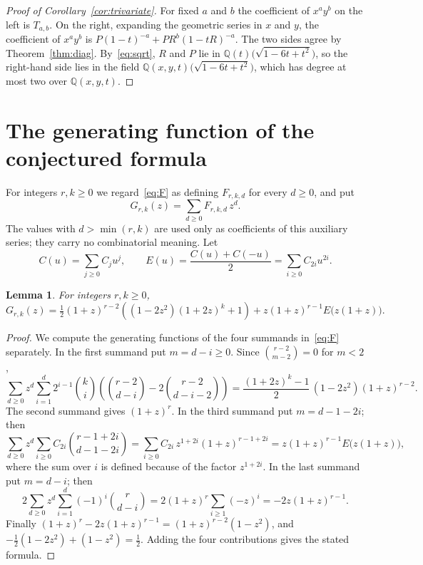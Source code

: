 \documentclass{amsart}
\newtheorem{lemma}[theorem]{Lemma}
\theoremstyle{definition}
\theoremstyle{remark}
\numberwithin{equation}{section}
\newcommand{\Q}{\mathbb{Q}}
\begin{document}
\begin{proof}[Proof of Corollary~\ref{cor:trivariate}]
For fixed $a$ and $b$ the coefficient of $x^ay^b$ on the left is $T_{a,b}$. On the right, expanding the geometric series in $x$ and $y$, the coefficient of $x^ay^b$ is $P(1-t)^{-a}+PR^b(1-tR)^{-a}$. The two sides agree by Theorem~\ref{thm:diag}. By~\eqref{eq:sqrt}, $R$ and $P$ lie in $\Q(t)\bigl(\sqrt{1-6t+t^2}\bigr)$, so the right-hand side lies in the field $\Q(x,y,t)\bigl(\sqrt{1-6t+t^2}\bigr)$, which has degree at most two over $\Q(x,y,t)$.
\end{proof}

\section{The generating function of the conjectured formula}\label{sec:F}

For integers $r,k\ge0$ we regard~\eqref{eq:F} as defining $F_{r,k,d}$ for every $d\ge0$, and put
\[
G_{r,k}(z)=\sum_{d\ge0}F_{r,k,d}\,z^d.
\]
The values with $d>\min(r,k)$ are used only as coefficients of this auxiliary series; they carry no combinatorial meaning. Let
\[
C(u)=\sum_{j\ge0}C_ju^j,\qquad E(u)=\frac{C(u)+C(-u)}{2}=\sum_{i\ge0}C_{2i}u^{2i}.
\]

\begin{lemma}\label{lem:Gz}
For integers $r,k\ge0$,
\[
G_{r,k}(z)=\tfrac12(1+z)^{r-2}\left((1-2z^2)(1+2z)^k+1\right)+z(1+z)^{r-1}E\bigl(z(1+z)\bigr).
\]
\end{lemma}

\begin{proof}
We compute the generating functions of the four summands in~\eqref{eq:F} separately. In the first summand put $m=d-i\ge0$. Since $\binom{r-2}{m-2}=0$ for $m<2$,
\[
\sum_{d\ge0}z^d\sum_{i=1}^{d}2^{i-1}\binom{k}{i}\left(\binom{r-2}{d-i}-2\binom{r-2}{d-i-2}\right)
=\frac{(1+2z)^k-1}{2}\,(1-2z^2)(1+z)^{r-2}.
\]
The second summand gives $(1+z)^r$. In the third summand put $m=d-1-2i$; then
\[
\sum_{d\ge0}z^d\sum_{i\ge0}C_{2i}\binom{r-1+2i}{d-1-2i}=\sum_{i\ge0}C_{2i}\,z^{1+2i}(1+z)^{r-1+2i}=z(1+z)^{r-1}E\bigl(z(1+z)\bigr),
\]
where the sum over $i$ is defined because of the factor $z^{1+2i}$. In the last summand put $m=d-i$; then
\[
2\sum_{d\ge0}z^d\sum_{i=1}^{d}(-1)^i\binom{r}{d-i}=2(1+z)^r\sum_{i\ge1}(-z)^i=-2z(1+z)^{r-1}.
\]
Finally $(1+z)^r-2z(1+z)^{r-1}=(1+z)^{r-2}(1-z^2)$, and $-\tfrac12(1-2z^2)+(1-z^2)=\tfrac12$. Adding the four contributions gives the stated formula.
\end{proof}
\end{document}
